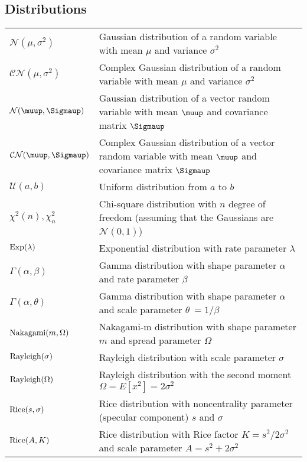 \documentclass{article}
\begin{document}
\subsection{Distributions}
\begin{xltabular}{\textwidth}{XX}
    \(\mathcal{N}(\mu, \sigma^2)\) & Gaussian distribution of a random variable with mean \(\mu\) and variance \(\sigma^{2}\)\\
    \(\mathcal{CN}(\mu, \sigma^2)\) & Complex Gaussian distribution of a random variable with mean \(\mu\) and variance \(\sigma^{2}\)\\
    \(\mathcal{N}(\boldsymbol{\muup}, \boldsymbol{\Sigmaup})\) & Gaussian distribution of a vector random variable with mean \(\boldsymbol{\muup}\) and covariance matrix \(\boldsymbol{\Sigmaup}\)\\
    \(\mathcal{CN}(\boldsymbol{\muup}, \boldsymbol{\Sigmaup})\) & Complex Gaussian distribution of a vector random variable with mean \(\boldsymbol{\muup}\) and covariance matrix \(\boldsymbol{\Sigmaup}\)\\
    \(\mathcal{U}(a,b)\) & Uniform distribution from \(a\) to \(b\)\\
    \(\chi^2 (n), \chi^2_n\) & Chi-square distribution with \(n\) degree of freedom (assuming that the Gaussians are \(\mathcal{N}(0,1)\))\\
    \(\textnormal{Exp}(\lambda)\) & Exponential distribution with rate parameter \(\lambda\)\\
    \(\Gamma(\alpha, \beta)\) & Gamma distribution with shape parameter \(\alpha\) and rate parameter \(\beta\)\\
    \(\Gamma(\alpha, \theta)\) & Gamma distribution with shape parameter \(\alpha\) and scale parameter \(\theta\ = 1/\beta\)\\
    \(\textnormal{Nakagami}(m, \Omega)\) & Nakagami-m distribution with shape parameter \(m\) and spread parameter \(\Omega\) \\
    \(\textnormal{Rayleigh}(\sigma)\) & Rayleigh distribution with scale parameter \(\sigma\)\\
    \(\textnormal{Rayleigh}(\Omega)\) & Rayleigh distribution with the second moment \(\Omega = E\left[ x^2 \right] = 2\sigma^2\)\\
    \(\textnormal{Rice}(s, \sigma)\) & Rice distribution with noncentrality parameter (specular component) \(s\) and \(\sigma\)\\
    \(\textnormal{Rice}(A, K)\) & Rice distribution with Rice factor \(K=s^2/2\sigma^2\) and scale parameter \(A = s^2 + 2\sigma^2\)
\end{xltabular}
\end{document}
